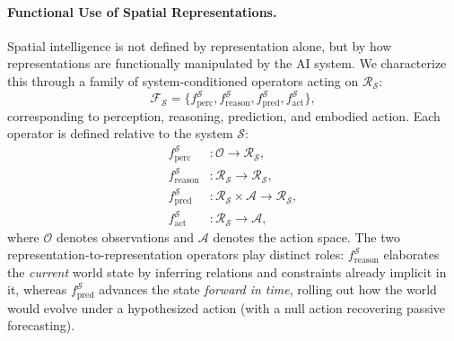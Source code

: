 \paragraph{Functional Use of Spatial Representations.}
Spatial intelligence is not defined by representation alone, but by how representations are functionally manipulated by the AI system.
We characterize this through a family of system-conditioned operators acting on $\mathcal{R}_{\mathcal{S}}$:
\begin{equation}
\mathcal{F}_{\mathcal{S}} = \{ f^{\mathcal{S}}_{\text{perc}}, f^{\mathcal{S}}_{\text{reason}}, f^{\mathcal{S}}_{\text{pred}}, f^{\mathcal{S}}_{\text{act}} \},
\end{equation}
corresponding to perception, reasoning, prediction, and embodied action.
Each operator is defined relative to the system $\mathcal{S}$:
\begin{align}
f^{\mathcal{S}}_{\text{perc}} &: \mathcal{O} \rightarrow \mathcal{R}_{\mathcal{S}}, \\
f^{\mathcal{S}}_{\text{reason}} &: \mathcal{R}_{\mathcal{S}} \rightarrow \mathcal{R}_{\mathcal{S}}, \\
f^{\mathcal{S}}_{\text{pred}} &: \mathcal{R}_{\mathcal{S}} \times \mathcal{A} \rightarrow \mathcal{R}_{\mathcal{S}}, \\
f^{\mathcal{S}}_{\text{act}} &: \mathcal{R}_{\mathcal{S}} \rightarrow \mathcal{A},
\end{align}
where $\mathcal{O}$ denotes observations and $\mathcal{A}$ denotes the action space.
The two representation-to-representation operators play distinct roles: $f^{\mathcal{S}}_{\text{reason}}$ elaborates the \emph{current} world state by inferring relations and constraints already implicit in it, whereas $f^{\mathcal{S}}_{\text{pred}}$ advances the state \emph{forward in time}, rolling out how the world would evolve under a hypothesized action (with a null action recovering passive forecasting).







